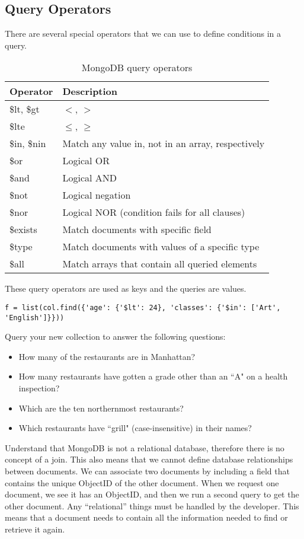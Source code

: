 \subsection*{Query Operators}
There are several special operators that we can use to define conditions in a query.
\begin{table}
\begin{tabular}{|l|l|}
\hline
Operator & Description \\
\hline
\$lt, \$gt & $<$, $>$ \\
\$lte & $\leq$, $\geq$ \\
\$in, \$nin & Match any value in, not in an array, respectively \\
\hline
\$or & Logical OR \\
\$and & Logical AND \\
\$not & Logical negation \\
\$nor & Logical NOR (condition fails for all clauses) \\
\hline
\$exists & Match documents with specific field \\
\$type & Match documents with values of a specific type \\
\hline
\$all & Match arrays that contain all queried elements \\
\hline
\end{tabular}
\caption{MongoDB query operators}
\label{table:queryoperators}
\end{table}
These query operators are used as keys and the queries are values.
\begin{lstlisting}
f = list(col.find({'age': {'$lt': 24}, 'classes': {'$in': ['Art', 'English']}}))
\end{lstlisting}

\begin{problem}
Query your new collection to answer the following questions:
\begin{itemize}
\item How many of the restaurants are in Manhattan?
\item How many restaurants have gotten a grade other than an ``A" on a health inspection?
\item Which are the ten northernmost restaurants?
\item Which restaurants have ``grill" (case-insensitive) in their names?
\end{itemize}
\end{problem}


Understand that MongoDB is not a relational database, therefore there is no concept of a join.  This also means that we cannot define database relationships between documents.  We can associate two documents by including a field that contains the unique ObjectID of the other document.  When we request one document, we see it has an ObjectID, and then we run a second query to get the other document.  Any ``relational'' things must be handled by the developer.  This means that a document needs to contain all the information needed to find or retrieve it again.

